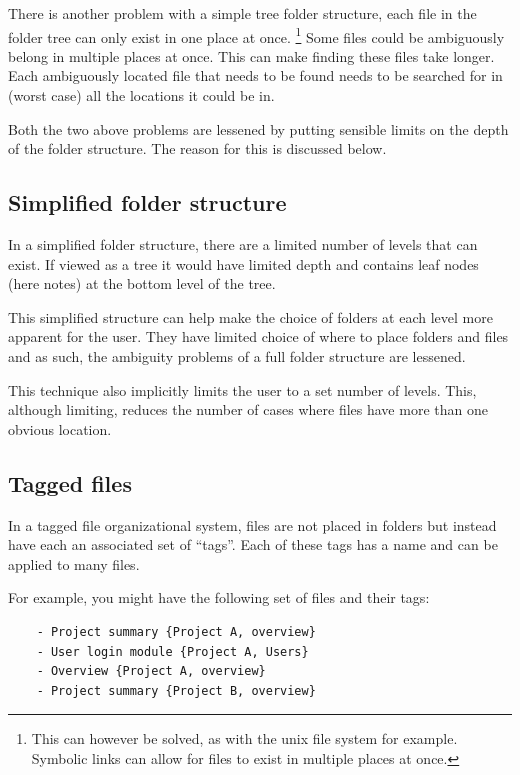 There is another problem with a simple tree folder structure, each file in the
folder tree can only exist in one place at once. %
%
\footnote{This can however be solved, as with the unix file system for example.
Symbolic links can allow for files to exist in multiple places at once. }%
%
Some files could be ambiguously belong in multiple places at once. This can make
finding these files take longer. Each ambiguously located file that needs to be
found needs to be searched for in (worst case) all the locations it could be in.

Both the two above problems are lessened by putting sensible limits on
the depth of the folder structure. The reason for this is discussed
below.

\subsection{Simplified folder structure}\label{simplified-folder-structure}

In a simplified folder structure, there are a limited number of levels that can
exist. If viewed as a tree it would have limited depth and contains leaf nodes
(here notes) at the bottom level of the tree.

This simplified structure can help make the choice of folders at each
level more apparent for the user. They have limited choice of
where to place folders and files and as such, the ambiguity problems of a
full folder structure are lessened.

This technique also implicitly limits the user to a set number of
levels. This, although limiting, reduces the number of cases where files have
 more than one obvious location.

\subsection{Tagged files}\label{tagged-files}

In a tagged file organizational system, files are not placed in folders
but instead have each an associated set of ``tags''. Each of these tags
has a name and can be applied to many files.

For example, you might have the following set of files and their tags:

\begin{verbatim}
    - Project summary {Project A, overview}
    - User login module {Project A, Users}
    - Overview {Project A, overview}
    - Project summary {Project B, overview}
\end{verbatim}

